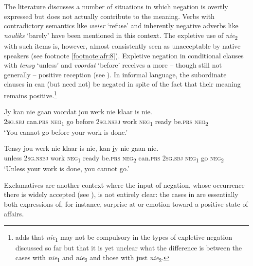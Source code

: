 \documentclass[output=paper,colorlinks,citecolor=brown]{langscibook}
\begin{document}
The literature discusses a number of situations in which negation is overtly expressed but does not actually contribute to the meaning. Verbs with contradictory semantics like \textit{weier} ‘refuse’ and inherently negative adverbs like \textit{nouliks} ‘barely’ have been mentioned in this context. The expletive use of \textit{nie}\textsubscript{2} with such items is, however, almost consistently seen as unacceptable by native speakers (see footnote \ref{footnote:afr:8}). Expletive negation in conditional clauses with \textit{tensy} ‘unless’ and \textit{voordat} ‘before’ receives a more – though still not generally – positive reception (see \citealt[60--63]{Potgieter2018}). In informal language, the subordinate clauses in  can (but need not) be negated in spite of the fact that their meaning remains positive.\footnote{\citet[102]{Biberauer2009} adds that \textit{nie}\textsubscript{1} may not be compulsory in the types of expletive negation discussed so far but that it is yet unclear what the difference is between the cases with \textit{nie}\textsubscript{1} and \textit{nie}\textsubscript{2} and those with just \textit{nie}\textsubscript{2}.}

\ea\label{ex:afr:49}
    \ea\label{ex:afr:49a}
        \gll Jy kan nie gaan voordat jou werk nie klaar is nie. \\ 
             \textsc{2sg.sbj} can.\textsc{prs} \textsc{neg}\textsubscript{1} go    before  2\textsc{sg.nsbj} work \textsc{neg}\textsubscript{1} ready  be.\textsc{prs} \textsc{neg}\textsubscript{2} \\
        \glt ‘You cannot go before your work is done.’ \citep[405]{Donaldson1993}
    
    \ex\label{ex:afr:49b}
        \gll Tensy jou werk nie klaar is nie, kan jy nie gaan nie. \\
             unless  2\textsc{sg.nsbj} work \textsc{neg}\textsubscript{1} ready  be.\textsc{prs} \textsc{neg}\textsubscript{2} can.\textsc{prs} \textsc{2sg.sbj} \textsc{neg}\textsubscript{1} go \textsc{neg}\textsubscript{2} \\
        \glt ‘Unless your work is done, you cannot go.’\citep[405]{Donaldson1993}
    \z
\z 

Exclamatives are another context where the input of negation, whose occurrence there is widely accepted (see \citealt[63--64]{Potgieter2018}), is not entirely clear: the cases in  are essentially both expressions of, for instance, surprise at or emotion toward a positive state of affairs.
\end{document}
